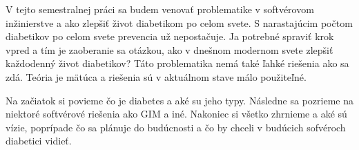 V tejto semestralnej práci sa budem venovať problematike v softvérovom inžinierstve a ako zlepšiť život diabetikom po celom svete. S narastajúcim počtom diabetikov po celom svete prevencia už nepostačuje.
Ja potrebné spraviť krok vpred a tím je zaoberanie sa otázkou, ako v dnešnom modernom svete zlepšiť každodenný život diabetikov? 
Táto problematika nemá také ľahké riešenia ako sa zdá. Teória je mätúca a riešenia sú v aktuálnom stave málo použiteľné.

Na začiatok si povieme čo je diabetes a aké su jeho typy. Následne sa pozrieme na niektoré softvérové riešenia ako GIM a iné.
Nakoniec si všetko zhrnieme a aké sú vízie, poprípade čo sa plánuje do budúcnosti a čo by chceli v budúcich sofvéroch diabetici vidieť. 




